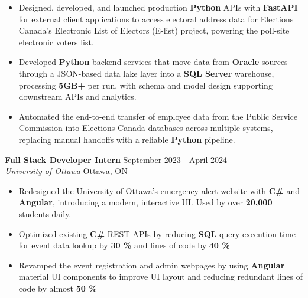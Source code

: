 \documentclass[a4paper]{article}
\begin{document}
\begin{itemize}
\item Designed, developed, and launched production \textbf{Python} APIs with \textbf{FastAPI} for external client applications to access electoral address data for Elections Canada's Electronic List of Electors (E-list) project, powering the poll-site electronic voters list.

\item Developed \textbf{Python} backend services that move data from \textbf{Oracle} sources through a JSON-based data lake layer into a \textbf{SQL Server} warehouse, processing \textbf{5GB+} per run, with schema and model design supporting downstream APIs and analytics.

\item Automated the end-to-end transfer of employee data from the Public Service Commission into Elections Canada databases across multiple systems, replacing manual handoffs with a reliable \textbf{Python} pipeline.

\end{itemize}

\textbf{Full Stack Developer Intern } \hfill September 2023 - April 2024\\
\textit{University of Ottawa} \hfill Ottawa, ON\\
\vspace{-2mm}
\begin{itemize} \itemsep -4pt
    \item Redesigned the University of Ottawa's emergency alert website with \textbf{C\#} and \textbf{Angular}, introducing a modern, interactive UI. Used by over \textbf{20,000} students daily.
     \item Optimized existing \textbf{C\#} REST APIs by reducing \textbf{SQL} query execution time for event data lookup by \textbf{30 \%} and lines of code by \textbf{40 \%}
    \item Revamped the event registration and admin webpages by using \textbf{Angular} material UI components to improve UI layout and reducing redundant lines of code by almost \textbf{50 \%}
\end{itemize}
\end{document}
